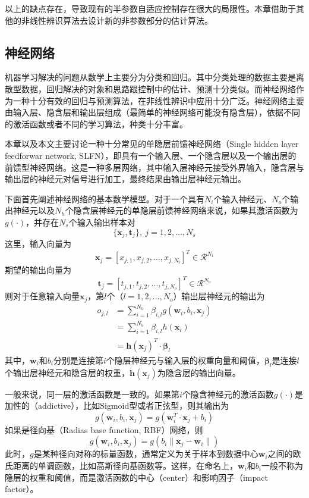 以上的缺点存在，导致现有的半参数自适应控制存在很大的局限性。本章借助于其他的非线性辨识算法去设计新的非参数部分的估计算法。

\subsection{神经网络}
机器学习解决的问题从数学上主要分为分类和回归。其中分类处理的数据主要是离散型数据，回归解决的对象和思路跟控制中的估计、预测十分类似。而神经网络作为一种十分有效的回归与预测算法，在非线性辨识中应用十分广泛。神经网络主要由输入层、隐含层和输出层组成（最简单的神经网络可能没有隐含层），依据不同的激活函数或者不同的学习算法，种类十分丰富。

本章以及本文主要讨论一种十分常见的单隐层前馈神经网络（Single hidden layer feedforwar network, SLFN），即具有一个输入层、一个隐含层以及一个输出层的前馈型神经网络。这是一种多层网络，其中输入层神经元接受外界输入，隐含层与输出层的神经元对信号进行加工，最终结果由输出层神经元输出。

下面首先阐述神经网络的基本数学模型。对于一个具有$N_{i}$个输入神经元、$N_{o}$个输出神经元以及$N_{h}$个隐含层神经元的单隐层前馈神经网络来说，如果其激活函数为$g(\cdot)$，并存在$N_{s}$个输入输出样本对
$$\{\bm{x}_{j},\bm{t}_{j}\},\ j=1,2,\ldots,N_{s}$$
这里，输入向量为
$$\bm{x}_{j}=[x_{j,1},x_{j,2},\ldots,x_{j,N_{i}}]^{T}\in \mathcal{R}^{N_{i}}$$
期望的输出向量为
$$\bm{t}_{j}=[t_{j,1},t_{j,2},\ldots,t_{j,N_{o}}]^{T}\in \mathcal{R}^{N_{o}}$$
则对于任意输入向量$\bm{x}_{j}$，第$l$个（$l=1,2,\dots,N_{o}$）输出层神经元的输出为
\begin{equation}%
\label{eq:4.slfn.o}
\begin{split}%
o_{j,l}&=\sum_{i=1}^{N_{h}} \beta_{i,l} g(\bm{w}_{i},b_{i},\bm{x}_{j})\\
&=\sum_{i=1}^{N_{h}} \beta_{i,l} h(\bm{x}_{i})\\
&=\bm{h}(\bm{x}_{j})^{T}\cdot\bm{\beta}_{l}
\end{split}
\end{equation}
其中，$\bm{w}_{i}$和$b_{i}$分别是连接第$i$个隐层神经元与输入层的权重向量和阈值，$\bm{\beta}_{l}$是连接$l$个输出层神经元和隐含层的权重，$\bm{h}(\bm{x}_{j})$为隐含层的输出向量。

一般来说，同一层的激活函数是一致的。如果第$i$个隐含神经元的激活函数$g(\cdot)$是加性的（addictive），比如Sigmoid型或者正弦型，则其输出为
\begin{equation}%
g(\bm{w}_{i},b_{i},\bm{x}_{j})=g(\bm{w}_{i}^{T}\cdot\bm{x}_{j}+b_{i})
\end{equation}
如果是径向基（Radias base function, RBF）网络，则
\begin{equation}%
g(\bm{w}_{i},b_{i},\bm{x}_{j})=g(b_{i}\|\bm{x}_{j}-\bm{w}_{i}\|)
\end{equation}
此时，$g$是某种径向对称的标量函数，通常定义为关于样本到数据中心$\bm{w}_{i}$之间的欧氏距离的单调函数，比如高斯径向基函数等。这样，在命名上，$\bm{w}_{i}$和$b_{i}$一般不称为隐层的权重和阈值，而是激活函数的中心（center）和影响因子（impact factor）。

